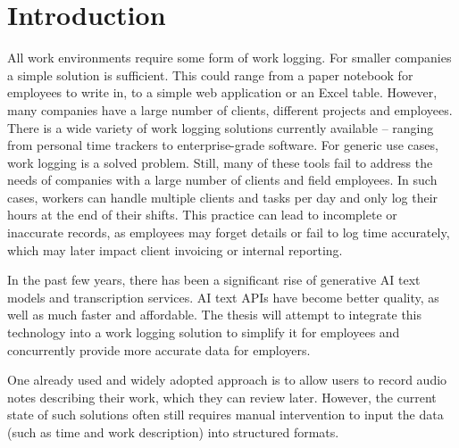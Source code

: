 \documentclass[
  digital,     %
  oneside,     %
  nosansbold,  %
  nocolorbold, %
  lof,         %
  lot,         %
]{fithesis4}
\begin{document}
\chapter*{Introduction}
All work environments require some form of work logging. For smaller companies a simple solution is sufficient. This could range from a paper notebook for employees to write in, to a simple web application or an Excel table. However, many companies have a large number of clients, different projects and employees. There is a wide variety of work logging solutions currently available – ranging from personal time trackers to enterprise-grade software. For generic use cases, work logging is a solved problem. Still, many of these tools fail to address the needs of companies with a large number of clients and field employees. In such cases, workers can handle multiple clients and tasks per day and only log their hours at the end of their shifts. This practice can lead to incomplete or inaccurate records, as employees may forget details or fail to log time accurately, which may later impact client invoicing or internal reporting.

In the past few years, there has been a significant rise of generative AI text models and transcription services. AI text APIs have become better quality, as well as  much faster and affordable. The thesis will attempt to integrate this technology into a work logging solution to simplify it for employees and concurrently provide more accurate data for employers.

One already used and widely adopted approach is to allow users to record audio notes describing their work, which they can review later. However, the current state of such solutions often still requires manual intervention to input the data (such as time and work description) into structured formats.
\end{document}
